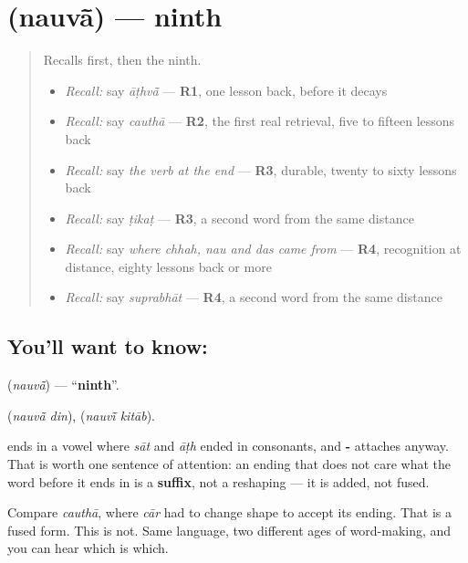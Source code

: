 \section[\texorpdfstring{\hi{नौवाँ} / \hi{नौवीं} (nauvā̃ / nauvī̃)}{नौवाँ / नौवीं (nauvā̃ / nauvī̃)}]{ (nauvā̃) — ninth}

\label{lesson:HI-C76-ninth}



\begin{quote}
Recalls first, then the ninth.

\begin{itemize}
\raggedright
  \item \emph{Recall:} say \emph{āṭhvā̃} — \textbf{R1}, one lesson back, before it decays
  \item \emph{Recall:} say \emph{cauthā} — \textbf{R2}, the first real retrieval, five to fifteen lessons back
  \item \emph{Recall:} say \emph{the verb at the end} — \textbf{R3}, durable, twenty to sixty lessons back
  \item \emph{Recall:} say \emph{ṭikaṭ} — \textbf{R3}, a second word from the same distance
  \item \emph{Recall:} say \emph{where chhah, nau and das came from} — \textbf{R4}, recognition at distance, eighty lessons back or more
  \item \emph{Recall:} say \emph{suprabhāt} — \textbf{R4}, a second word from the same distance
\end{itemize}
\end{quote}

\subsection*{You'll want to know: }
\textbf{} (\emph{nauvā̃}) — \textquotedblleft{}\textbf{ninth}\textquotedblright{}.

\textbf{ } (\emph{nauvā̃ din}), \textbf{ } (\emph{nauvī̃ kitāb}).

\textbf{} ends in a vowel where \emph{sāt} and \emph{āṭh} ended in consonants, and \textbf{-} attaches anyway. That is worth one sentence of attention: an ending that does not care what the word before it ends in is a \textbf{suffix}, not a reshaping — it is added, not fused.

Compare \emph{cauthā}, where \emph{cār} had to change shape to accept its ending. That is a fused form. This is not. Same language, two different ages of word-making, and you can hear which is which.

